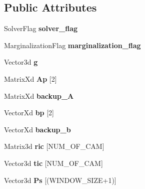 \subsection*{Public Attributes}
\begin{DoxyCompactItemize}
\item 
\mbox{\label{classEstimator_a324ff7205fc2cce24547b6ff96e63271}} 
Solver\+Flag {\bfseries solver\+\_\+flag}
\item 
\mbox{\label{classEstimator_a4b22b2fb74b9118ff6732fc5342e5636}} 
Marginalization\+Flag {\bfseries marginalization\+\_\+flag}
\item 
\mbox{\label{classEstimator_aa47626f7b8776f9ddd8c9aec1f0a9921}} 
Vector3d {\bfseries g}
\item 
\mbox{\label{classEstimator_a2d641d68416a77576d1a23cc8d03beb4}} 
Matrix\+Xd {\bfseries Ap} \mbox{[}2\mbox{]}
\item 
\mbox{\label{classEstimator_a2b5ba9e2978481957725122269513377}} 
Matrix\+Xd {\bfseries backup\+\_\+A}
\item 
\mbox{\label{classEstimator_ab06a60da062f5de4216b69cf10a972c3}} 
Vector\+Xd {\bfseries bp} \mbox{[}2\mbox{]}
\item 
\mbox{\label{classEstimator_a5d8208de33fb48e77d64e80c6ed7d159}} 
Vector\+Xd {\bfseries backup\+\_\+b}
\item 
\mbox{\label{classEstimator_aa2281c4dbc639434752ff72a63c143c5}} 
Matrix3d {\bfseries ric} \mbox{[}N\+U\+M\+\_\+\+O\+F\+\_\+\+C\+AM\mbox{]}
\item 
\mbox{\label{classEstimator_a2cc2a6796ea2f568543364fede9e1741}} 
Vector3d {\bfseries tic} \mbox{[}N\+U\+M\+\_\+\+O\+F\+\_\+\+C\+AM\mbox{]}
\item 
\mbox{\label{classEstimator_ae39aafb5802c16f66b9b478861c05214}} 
Vector3d {\bfseries Ps} \mbox{[}(W\+I\+N\+D\+O\+W\+\_\+\+S\+I\+ZE+1)\mbox{]}
\item 
\mbox{\label{classEstimator_a261ce91e7dbfb155d52c09daf1a81f4e}} 

\end{DoxyCompactItemize}
